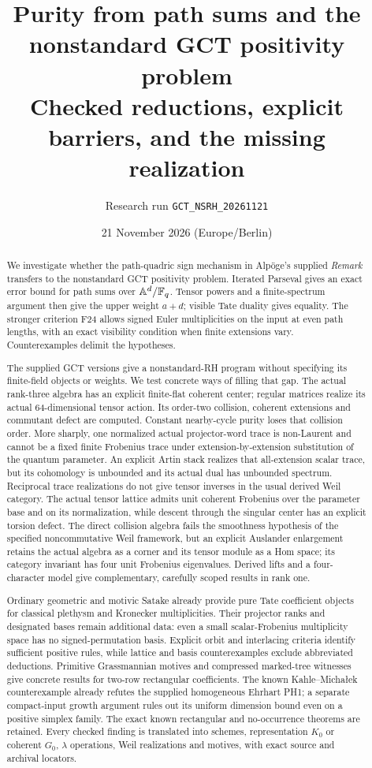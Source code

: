 \documentclass[11pt,a4paper]{article}
\title{Purity from path sums and the nonstandard GCT positivity problem\\[4pt]\large Checked reductions, explicit barriers, and the missing realization}
\author{Research run \texttt{GCT\_NSRH\_20261121}}
\date{21 November 2026 (Europe/Berlin)}
\newcommand{\A}{\mathbb A}\newcommand{\PP}{\mathbb P}\newcommand{\GL}{\mathrm{GL}}
\theoremstyle{named}\newtheorem{finding}{Finding}[section]
\theoremstyle{definition}\newtheorem{definition}[finding]{Definition}
\theoremstyle{remark}\newtheorem{remark}[finding]{Remark}
\begin{document}
\maketitle
\begin{abstract}
We investigate whether the path-quadric sign mechanism in Alp\"oge's supplied \emph{Remark} transfers to the nonstandard GCT positivity problem. Iterated Parseval gives an exact error bound for path sums over $\A^d/\F_q$. Tensor powers and a finite-spectrum argument then give the upper weight $a+d$; visible Tate duality gives equality. The stronger criterion F24 allows signed Euler multiplicities on the input at even path lengths, with an exact visibility condition when finite extensions vary. Counterexamples delimit the hypotheses.

The supplied GCT versions give a nonstandard-RH program without specifying its finite-field objects or weights. We test concrete ways of filling that gap. The actual rank-three algebra has an explicit finite-flat coherent center; regular matrices realize its actual 64-dimensional tensor action. Its order-two collision, coherent extensions and commutant defect are computed. Constant nearby-cycle purity loses that collision order. More sharply, one normalized actual projector-word trace is non-Laurent and cannot be a fixed finite Frobenius trace under extension-by-extension substitution of the quantum parameter. An explicit Artin stack realizes that all-extension scalar trace, but its cohomology is unbounded and its actual dual has unbounded spectrum. Reciprocal trace realizations do not give tensor inverses in the usual derived Weil category. The actual tensor lattice admits unit coherent Frobenius over the parameter base and on its normalization, while descent through the singular center has an explicit torsion defect. The direct collision algebra fails the smoothness hypothesis of the specified noncommutative Weil framework, but an explicit Auslander enlargement retains the actual algebra as a corner and its tensor module as a Hom space; its category invariant has four unit Frobenius eigenvalues. Derived lifts and a four-character model give complementary, carefully scoped results in rank one.

Ordinary geometric and motivic Satake already provide pure Tate coefficient objects for classical plethysm and Kronecker multiplicities. Their projector ranks and designated bases remain additional data: even a small scalar-Frobenius multiplicity space has no signed-permutation basis. Explicit orbit and interlacing criteria identify sufficient positive rules, while lattice and basis counterexamples exclude abbreviated deductions. Primitive Grassmannian motives and compressed marked-tree witnesses give concrete results for two-row rectangular coefficients. The known Kahle--Micha{\l}ek counterexample already refutes the supplied homogeneous Ehrhart PH1; a separate compact-input growth argument rules out its uniform dimension bound even on a positive simplex family. The exact known rectangular and no-occurrence theorems are retained. Every checked finding is translated into schemes, representation $K_0$ or coherent $G_0$, $\lambda$ operations, Weil realizations and motives, with exact source and archival locators.

\end{abstract}
\end{document}
